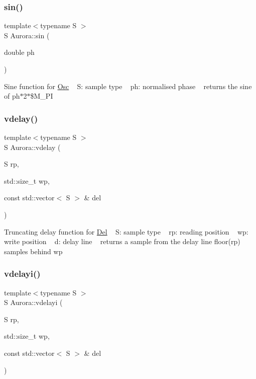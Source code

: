 \subsubsection{\texorpdfstring{sin()}{sin()}}
{\footnotesize\ttfamily template$<$typename S $>$ \\
S Aurora\+::sin (\begin{DoxyParamCaption}\item[{double}]{ph }\end{DoxyParamCaption})}

Sine function for \hyperlink{class_aurora_1_1_osc}{Osc} ~\newline
S\+: sample type ~\newline
ph\+: normalised phase ~\newline
returns the sine of ph$\ast$2$\ast$\$\+M\+\_\+\+PI \mbox{\label{namespace_aurora_ab93392950e0b9ae8fbbccf7cc1b55a13}} 
\subsubsection{\texorpdfstring{vdelay()}{vdelay()}}
{\footnotesize\ttfamily template$<$typename S $>$ \\
S Aurora\+::vdelay (\begin{DoxyParamCaption}\item[{S}]{rp,  }\item[{std\+::size\+\_\+t}]{wp,  }\item[{const std\+::vector$<$ S $>$ \&}]{del }\end{DoxyParamCaption})}

Truncating delay function for \hyperlink{class_aurora_1_1_del}{Del} ~\newline
S\+: sample type ~\newline
rp\+: reading position ~\newline
wp\+: write position ~\newline
d\+: delay line ~\newline
returns a sample from the delay line floor(rp) samples behind wp \mbox{\label{namespace_aurora_a5318ddb492590ada5dc40ba80bbf655b}} 
\subsubsection{\texorpdfstring{vdelayi()}{vdelayi()}}
{\footnotesize\ttfamily template$<$typename S $>$ \\
S Aurora\+::vdelayi (\begin{DoxyParamCaption}\item[{S}]{rp,  }\item[{std\+::size\+\_\+t}]{wp,  }\item[{const std\+::vector$<$ S $>$ \&}]{del }\end{DoxyParamCaption})}

